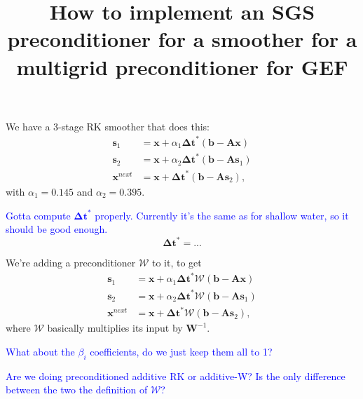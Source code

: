 \documentclass[12pt]{article}
\title{How to implement an SGS preconditioner for a smoother for a multigrid preconditioner for GEF}
\newcommand{\todo}[1]{\textcolor{blue}{#1}}
\begin{document}
\maketitle

We have a 3-stage RK smoother that does this:
\begin{align}
    \bm{s}_1 &= \bm{x} + \alpha_1 \bm{\Delta t}^* (\bm{b} - \bm{Ax}) \\
    \bm{s}_2 &= \bm{x} + \alpha_2 \bm{\Delta t}^* (\bm{b} - \bm{As}_1) \\
    \bm{x}^{next} &= \bm{x} + \bm{\Delta t}^* (\bm{b} - \bm{As}_2),
\end{align}
with $\alpha_1 = 0.145$ and $\alpha_2 = 0.395$.

\todo{Gotta compute $\bm{\Delta t}^*$ properly. Currently it's the same as for shallow water, so it should be good enough.}
\begin{equation}
    \bm{\Delta t}^* = ...
\end{equation}

We're adding a preconditioner $\mathcal{W}$ to it, to get
\begin{subequations}\label{eq:precond_rk_smoother}
\begin{align}
    \bm{s}_1      &= \bm{x} + \alpha_1 \bm{\Delta t}^* \mathcal{W}(\bm{b} - \bm{Ax}) \\
    \bm{s}_2      &= \bm{x} + \alpha_2 \bm{\Delta t}^* \mathcal{W}(\bm{b} - \bm{As}_1) \\
    \bm{x}^{next} &= \bm{x} + \bm{\Delta t}^* \mathcal{W}(\bm{b} - \bm{As}_2),
\end{align}
\end{subequations}
where $\mathcal{W}$ basically multiplies its input by $\bm{W}^{-1}$.


\todo{What about the $\beta_i$ coefficients, do we just keep them all to 1?}

\todo{Are we doing preconditioned additive RK or additive-W? Is the only difference between the two the definition of $\mathcal{W}$?}


\end{document}
